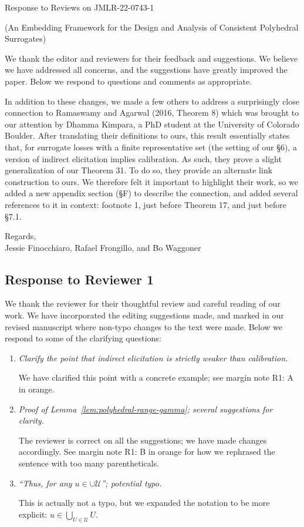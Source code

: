 \documentclass[a4paper]{article}
\begin{document}
\begin{center}
  {\Large Response to Reviews on JMLR-22-0743-1}
  
  (An Embedding Framework for the Design and Analysis of Consistent Polyhedral Surrogates)
\end{center}


We thank the editor and reviewers for their feedback and suggestions.
We believe we have addressed all concerns, and the suggestions have greatly improved the paper.
Below we respond to questions and comments as appropriate.

In addition to these changes, we made a few others to address a surprisingly close connection to Ramaswamy and Agarwal (2016, Theorem 8) which was brought to our attention by Dhamma Kimpara, a PhD student at the University of Colorado Boulder.
After translating their definitions to ours, this result essentially states that, for surrogate losses with a finite representative set (the setting of our \S 6), a version of indirect elicitation implies calibration.
As such, they prove a slight generalization of our Theorem 31.
To do so, they provide an alternate link construction to ours.
We therefore felt it important to highlight their work, so we added a new appendix section (\S F) to describe the connection, and added several references to it in context: footnote 1, just before Theorem 17, and just before \S 7.1.

\bigskip
Regards,\\
Jessie Finocchiaro, Rafael Frongillo, and Bo Waggoner

\subsection*{Response to Reviewer 1}

We thank the reviewer for their thoughtful review and careful reading of our work. We have incorporated the editing suggestions made, and marked in our revised manuscript where non-typo changes to the text were made. 
Below we respond to some of the clarifying questions:
\begin{enumerate}
	\item \emph{Clarify the point that indirect elicitation is strictly weaker than calibration.}
	
	We have clarified this point with a concrete example; see margin note R1: A in orange.
	
	\item \emph{Proof of Lemma~\ref{lem:polyhedral-range-gamma}; several suggestions for clarity.}
		
	The reviewer is correct on all the suggestions; we have made changes accordingly.
	See margin note R1: B in orange for how we rephrased the sentence with too many parentheticals.

	\item \emph{``Thus, for any $u \in \cup \mathcal{U}$''; potential typo.}
	
	This is actually not a typo, but we expanded the notation to be more explicit: $u \in \bigcup_{U \in \mathcal{U}} U$.
\end{enumerate}
\end{document}
